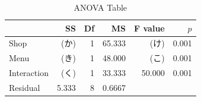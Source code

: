 \begin{table}[ht]
	\centering
	\caption{ANOVA Table}
	\begin{tabular}{lrrrrr}
		\hline
		            & SS    & Df & MS     & F value & $p$   \\
		\hline
		Shop        & (か)   & 1  & 65.333 & (け)     & 0.001 \\
		Menu        & (き)   & 1  & 48.000 & (こ)     & 0.001 \\
		Interaction & (く)   & 1  & 33.333 & 50.000  & 0.001 \\
		Residual    & 5.333 & 8  & 0.6667 &         &       \\
		\hline
	\end{tabular}
	\label{Example2Ans}
\end{table}
